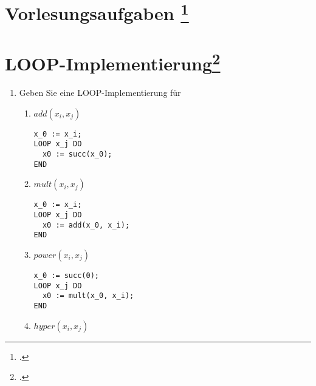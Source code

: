 \documentclass{bschlangaul-aufgabe}
\begin{document}
\section{Vorlesungsaufgaben
\footcite{theo:fs:4}}

%

\section{LOOP-Implementierung\footcite[Seite 11]{theo:fs:4}}

\begin{enumerate}
\item Geben Sie eine LOOP-Implementierung für

\begin{enumerate}

%

\item $add(x_i, x_j)$

\begin{liAntwort}
\begin{verbatim}
x_0 := x_i;
LOOP x_j DO
  x0 := succ(x_0);
END
\end{verbatim}
\end{liAntwort}

%

\item $mult(x_i, x_j)$

\begin{liAntwort}
\begin{verbatim}
x_0 := x_i;
LOOP x_j DO
  x0 := add(x_0, x_i);
END
\end{verbatim}
\end{liAntwort}

%

\item $power(x_i, x_j)$

\begin{liAntwort}
\begin{verbatim}
x_0 := succ(0);
LOOP x_j DO
  x0 := mult(x_0, x_i);
END
\end{verbatim}
\end{liAntwort}

%

\item $hyper(x_i, x_j)$


\end{enumerate}
\end{enumerate}
\end{document}
